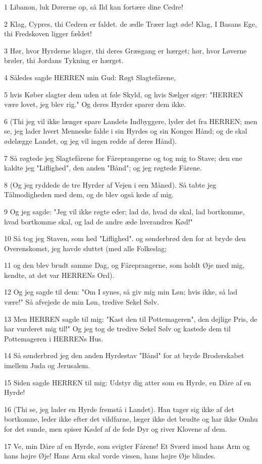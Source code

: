 \par 1 Libanon, luk Dørerne op, så Ild kan fortære dine Cedre!
\par 2 Klag, Cypres, thi Cedren er faldet. de ædle Træer lagt øde! Klag, I Basans Ege, thi Fredskoven ligger fældet!
\par 3 Hør, hvor Hyrderne klager, thi deres Græsgang er hærget; hør, hvor Løverne brøler, thi Jordans Tykning er hærget.
\par 4 Således sagde HERREN min Gud: Røgt Slagtefårene,
\par 5 hvis Køber slagter dem uden at føle Skyld, og hvis Sælger siger: "HERREN være lovet, jeg blev rig." Og deres Hyrder sparer dem ikke.
\par 6 (Thi jeg vil ikke længer spare Landets Indbyggere, lyder det fra HERREN; men se, jeg lader hvert Menneske falde i sin Hyrdes og sin Konges Hånd; og de skal ødelægge Landet, og jeg vil ingen redde af deres Hånd).
\par 7 Så røgtede jeg Slagtefårene for Fåreprangerne og tog mig to Stave; den ene kaldte jeg "Liflighed", den anden "Bånd"; og jeg røgtede Fårene.
\par 8 (Og jeg ryddede de tre Hyrder af Vejen i een Måned). Så tabte jeg Tålmodigheden med dem, og de blev også kede af mig.
\par 9 Og jeg sagde: "Jeg vil ikke røgte eder; lad dø, hvad dø skal, lad bortkomme, hvad bortkomme skal, og lad de andre æde hverandres Kød!"
\par 10 Så tog jeg Staven, som hed "Liflighed". og sønderbrød den for at bryde den Overenskomst, jeg havde sluttet (med alle Folkeslag;
\par 11 og den blev brudt samme Dag, og Fåreprangerne, som holdt Øje med mig, kendte, at det var HERRENs Ord).
\par 12 Og jeg sagde til dem: "Om I synes, så giv mig min Løn; hvis ikke, så lad være!" Så afvejede de min Løn, tredive Sekel Sølv.
\par 13 Men HERREN sagde til mig: "Kast den til Pottemageren", den dejlige Pris, de har vurderet mig til!" Og jeg tog de tredive Sekel Sølv og kastede dem til Pottemageren i HERRENs Hus.
\par 14 Så sønderbrød jeg den anden Hyrdestav "Bånd" for at bryde Broderskabet imellem Juda og Jerusalem.
\par 15 Siden sagde HERREN til mig: Udstyr dig atter som en Hyrde, en Dåre af en Hyrde!
\par 16 (Thi se, jeg lader en Hyrde fremstå i Landet). Han tager sig ikke af det bortkomne, leder ikke efter det vildfarne, læger ikke det brudte og har ikke Omhu for det sunde, men spiser Kødef af de fede Dyr og river Klovene af dem.
\par 17 Ve, min Dåre af en Hyrde, som svigter Fårene! Et Sværd imod hans Arm og hans højre Øje! Hans Arm skal vorde vissen, hans højre Øje blindes.


